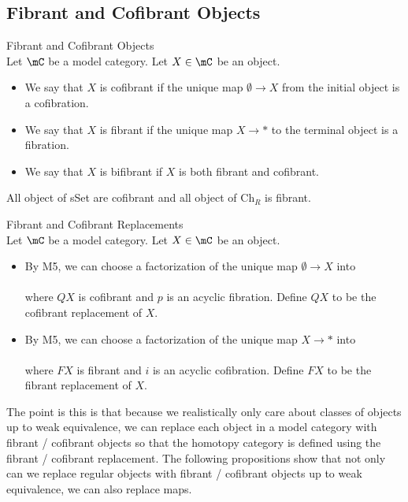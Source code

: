 \documentclass[a4paper]{article}
\begin{document}
\subsection{Fibrant and Cofibrant Objects}
\begin{defn}{Fibrant and Cofibrant Objects}{}\\ Let $\mC$ be a model category. Let $X\in\mC$ be an object. 
\begin{itemize}
\item We say that $X$ is cofibrant if the unique map $\emptyset\to X$ from the initial object is a cofibration. 
\item We say that $X$ is fibrant if the unique map $X\to\ast$ to the terminal object is a fibration. 
\item We say that $X$ is bifibrant if $X$ is both fibrant and cofibrant. 
\end{itemize}
\end{defn}

All object of sSet are cofibrant and all object of $\text{Ch}_R$ is fibrant. 
\begin{defn}{Fibrant and Cofibrant Replacements}{}\\ Let $\mC$ be a model category. Let $X\in\mC$ be an object. 
\begin{itemize}
\item By M5, we can choose a factorization of the unique map $\emptyset\to X$ into \\
\\ 
where $QX$ is cofibrant and $p$ is an acyclic fibration. Define $QX$ to be the cofibrant replacement of $X$. 
\item By M5, we can choose a factorization of the unique map $X\to\ast$ into \\
\\ 
where $FX$ is fibrant and $i$ is an acyclic cofibration. Define $FX$ to be the fibrant replacement of $X$. 
\end{itemize}
\end{defn}

The point is this is that because we realistically only care about classes of objects up to weak equivalence, we can replace each object in a model category with fibrant / cofibrant objects so that the homotopy category is defined using the fibrant / cofibrant replacement. The following propositions show that not only can we replace regular objects with fibrant / cofibrant objects up to weak equivalence, we can also replace maps. 
\end{document}
